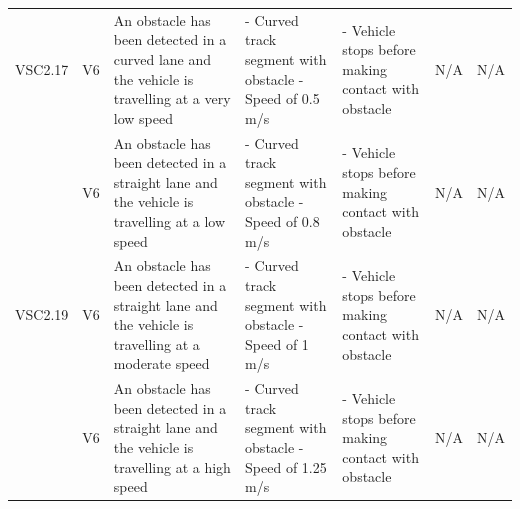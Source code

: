 \documentclass [10pt]{article}
\begin{document}
\begin{longtable}{ | p{ } | p{ } |  p{ } |  p{ } | p{ } | p{ } |  p{ } |}
    \multicolumn{1}{|c|}{VSC2.17} 
    & \multicolumn{1}{c|}{V6}
    & An obstacle has been detected in a curved lane and the vehicle is travelling at a very low speed
    & - Curved track segment with obstacle \newline - Speed of 0.5 m/s
    & - Vehicle stops before making contact with obstacle
    & N/A
    & \multicolumn{1}{c|}{N/A}\\ 
    
    \rowcolor{tableCell}\multicolumn{1}{|c|}{VSC2.18} 
    & \multicolumn{1}{c|}{V6}
    & An obstacle has been detected in a straight lane and the vehicle is travelling at a low speed
    & - Curved track segment with obstacle \newline - Speed of 0.8 m/s
    & - Vehicle stops before making contact with obstacle
    & N/A
    & \multicolumn{1}{c|}{N/A}\\ 
    
    \multicolumn{1}{|c|}{VSC2.19} 
    & \multicolumn{1}{c|}{V6}
    & An obstacle has been detected in a straight lane and the vehicle is travelling at a moderate speed
    & - Curved track segment with obstacle \newline - Speed of 1 m/s
    & - Vehicle stops before making contact with obstacle
    & N/A
    & \multicolumn{1}{c|}{N/A}\\
    
    \rowcolor{tableCell}\multicolumn{1}{|c|}{VSC2.20} 
    & \multicolumn{1}{c|}{V6}
    & An obstacle has been detected in a straight lane and the vehicle is travelling at a high speed
    & - Curved track segment with obstacle \newline - Speed of 1.25 m/s
    & - Vehicle stops before making contact with obstacle
    & N/A
    & \multicolumn{1}{c|}{N/A}\\\hline
     
    \end{longtable}
    
    
    
 
    
    
\end{document}
